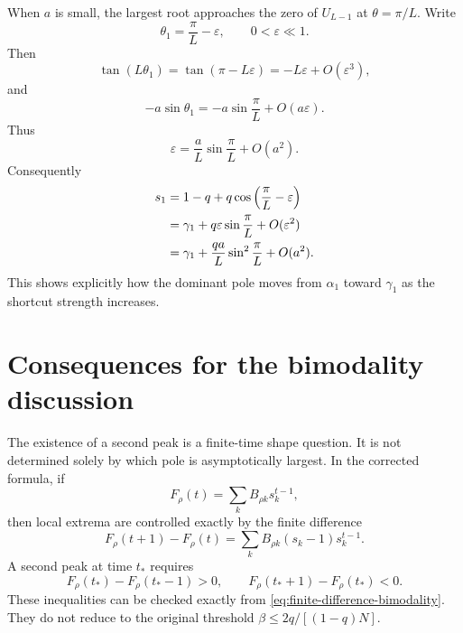 \documentclass[11pt]{article}
\begin{document}
When $a$ is small, the largest root approaches the zero of $U_{L-1}$ at
$\theta=\pi/L$.  Write
\begin{equation}
  \theta_1=\frac{\pi}{L}-\varepsilon,
  \qquad 0<\varepsilon\ll1.
\end{equation}
Then
\begin{equation}
  \tan(L\theta_1)=\tan(\pi-L\varepsilon)=-L\varepsilon+O(\varepsilon^3),
\end{equation}
and
\begin{equation}
  -a\sin\theta_1=-a\sin\frac{\pi}{L}+O(a\varepsilon).
\end{equation}
Thus
\begin{equation}
  \varepsilon=\frac{a}{L}\sin\frac{\pi}{L}+O(a^2).
\end{equation}
Consequently
\begin{align}
  s_1&=1-q+q\cos\left(\frac{\pi}{L}-\varepsilon\right)\notag\\
  &=\gamma_1+q\varepsilon\sin\frac{\pi}{L}+O(\varepsilon^2)\notag\\
  &=\gamma_1+\frac{qa}{L}\sin^2\frac{\pi}{L}+O(a^2).
\end{align}
This shows explicitly how the dominant pole moves from $\alpha_1$ toward $\gamma_1$ as the
shortcut strength increases.

\section{Consequences for the bimodality discussion}
\label{sec:bimodality}

The existence of a second peak is a finite-time shape question.  It is not determined solely by
which pole is asymptotically largest.  In the corrected formula, if
\begin{equation}
  F_\rho(t)=\sum_k B_{\rho k}s_k^{t-1},
\end{equation}
then local extrema are controlled exactly by the finite difference
\begin{equation}
  F_\rho(t+1)-F_\rho(t)=\sum_k B_{\rho k}(s_k-1)s_k^{t-1}.
  \label{eq:finite-difference-bimodality}
\end{equation}
A second peak at time $t_*$ requires
\begin{equation}
  F_\rho(t_*)-F_\rho(t_*-1)>0,
  \qquad
  F_\rho(t_*+1)-F_\rho(t_*)<0.
\end{equation}
These inequalities can be checked exactly from \eqref{eq:finite-difference-bimodality}.  They do
not reduce to the original threshold $\beta\leq2q/[(1-q)N]$.
\end{document}
